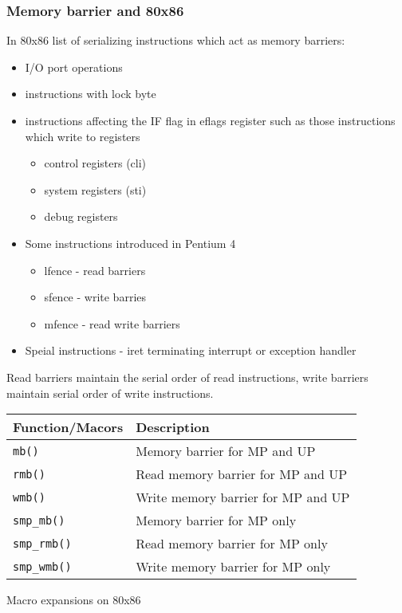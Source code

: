 \documentclass{article}
\begin{document}
\subsubsection{Memory barrier and 80x86}

  In 80x86 list of serializing instructions which act as memory
  barriers:


  \begin{itemize}
    \item I/O port operations
    \item instructions with lock byte
    \item instructions affecting the IF flag in eflags register such as those instructions which write to registers
      \begin{itemize}
        \item control registers (cli)
        \item system  registers (sti)
        \item debug   registers          
      \end {itemize}
    \item Some instructions introduced in Pentium 4
      \begin{itemize}
        \item lfence - read barriers
        \item sfence - write barries
        \item mfence - read write barriers
      \end{itemize}
    \item Speial instructions - iret terminating interrupt or exception handler                  
  \end{itemize}
  

Read barriers maintain the serial order of read instructions, write
barriers maintain serial order of write instructions.

\begin{center}
  \begin{tabular}{ l | l }    
    \hline
    Function/Macors & Description \\ \hline
    \lstinline{mb()} & Memory barrier for MP and UP \\ 
    \lstinline{rmb()} & Read memory barrier for MP and UP  \\ 
    \lstinline{wmb()} &  Write memory barrier for MP and UP \\
    \lstinline{smp_mb()} &  Memory barrier for MP only \\
    \lstinline{smp_rmb()} &  Read memory barrier for MP only \\
    \lstinline{smp_wmb()} &  Write memory barrier for MP only \\
    \hline
  \end{tabular}
\end{center}
  Macro expansions on  80x86
\end{document}

